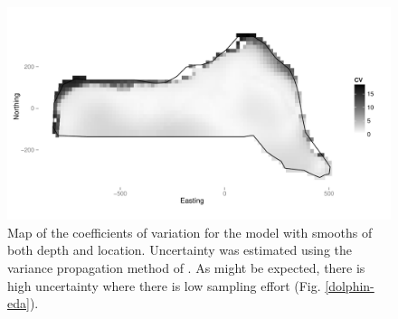 \documentclass[a4paper,12pt]{article}
\begin{document}
\begin{figure}[h!]
  \caption{Map of the coefficients of variation for the model with smooths of both depth and location. Uncertainty was estimated using the variance propagation method of \cite{WILLIAMS:2011in}. As might be expected, there is high uncertainty where there is low sampling effort (Fig. \ref{dolphin-eda}).}
  \label{cv-plot}
  \begin{center}
    \includegraphics[width=\textwidth]{cvplot-varprop}
  \end{center}
\end{figure}

\newpage
\end{document}
